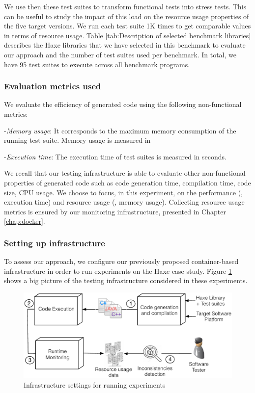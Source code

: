 We use then these test suites to transform functional tests into stress tests. This can be useful to study the impact of this load on the resource usage properties of the five target versions. 
We run each test suite 1K times to get comparable values in terms of resource usage.
Table \ref{tab:Description of selected benchmark libraries} describes the Haxe libraries that we have selected in this benchmark to evaluate our approach and the number of test suites used per benchmark.
In total, we have 95 test suites to execute across all benchmark programs.

\subsubsection{Evaluation metrics used}
We evaluate the efficiency of generated code using the following non-functional metrics:

-\textit{Memory usage}:
It corresponds to the maximum memory consumption of the running test suite. Memory usage is measured in \SI{}{\mega\byte}

-\textit{Execution time}:
The execution time of test suites is measured in seconds.

We recall that our testing infrastructure is able to evaluate other non-functional properties of generated code such as code generation time, compilation time, code size, CPU usage. We choose to focus, in this experiment, on the performance (\ie, execution time) and resource usage (\ie, memory usage). Collecting resource usage metrics is ensured by our monitoring infrastructure, presented in Chapter \ref{chap:docker}. 

\subsubsection{Setting up infrastructure}

To assess our approach, we configure our previously proposed container-based infrastructure in order to run experiments on the Haxe case study.
Figure \ref{fig:settingup.pdf} shows a big picture of the testing infrastructure considered in these experiments.

\begin{figure}[h]
	\centering
	\includegraphics[width=0.7\linewidth]{chapitre4/fig/settingup.pdf}
	\caption{Infrastructure settings for running experiments}
	\label{fig:settingup.pdf}
\end{figure}

